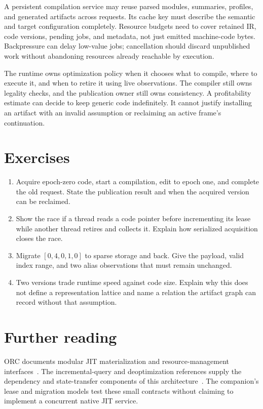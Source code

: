 A persistent compilation service may reuse parsed modules, summaries, profiles, and generated artifacts across requests.
Its cache key must describe the semantic and target configuration completely.
Resource budgets need to cover retained IR, code versions, pending jobs, and metadata, not just emitted machine-code bytes.
Backpressure can delay low-value jobs; cancellation should discard unpublished work without abandoning resources already reachable by execution.

The runtime owns optimization policy when it chooses what to compile, where to execute it, and when to retire it using live observations.
The compiler still owns legality checks, and the publication owner still owns consistency.
A profitability estimate can decide to keep generic code indefinitely.
It cannot justify installing an artifact with an invalid assumption or reclaiming an active frame's continuation.

\section{Exercises}
\label{sec:ch67-exercises}

\begin{enumerate}
\item\label{ex:ch67-stale} Acquire epoch-zero code, start a compilation, edit to epoch one, and complete the old request.
State the publication result and when the acquired version can be reclaimed.
\item\label{ex:ch67-race} Show the race if a thread reads a code pointer before incrementing its lease while another thread retires and collects it.
Explain how serialized acquisition closes the race.
\item\label{ex:ch67-sparse} Migrate $[0,4,0,1,0]$ to sparse storage and back.
Give the payload, valid index range, and two alias observations that must remain unchanged.
\item\label{ex:ch67-lattice} Two versions trade runtime speed against code size.
Explain why this does not define a representation lattice and name a relation the artifact graph can record without that assumption.
\end{enumerate}

\section{Further reading}
\label{sec:ch67-reading}

ORC documents modular JIT materialization and resource-management interfaces~\cite{llvm-2026-orc}.
The incremental-query and deoptimization references supply the dependency and state-transfer components of this architecture~\cite{rust-2026-incremental,fluckiger-2018-deoptimization}.
The companion's lease and migration models test these small contracts without claiming to implement a concurrent native JIT service.
